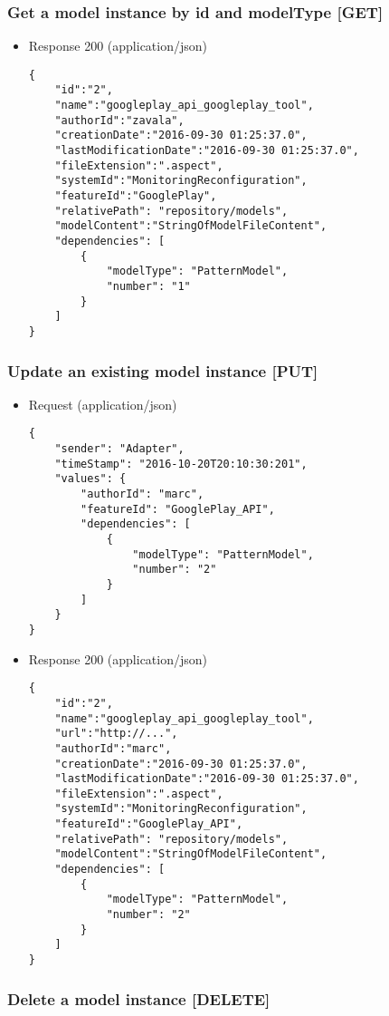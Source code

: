 \subsubsection{Get a model instance by id and modelType
{[}GET{]}}\label{get-a-model-instance-by-id-and-modeltype-get}

\begin{itemize}
\item
  Response 200 (application/json)

\begin{verbatim}
{
    "id":"2",
    "name":"googleplay_api_googleplay_tool",
    "authorId":"zavala",
    "creationDate":"2016-09-30 01:25:37.0",
    "lastModificationDate":"2016-09-30 01:25:37.0",
    "fileExtension":".aspect",
    "systemId":"MonitoringReconfiguration",
    "featureId":"GooglePlay",
    "relativePath": "repository/models",
    "modelContent":"StringOfModelFileContent",
    "dependencies": [
        {
            "modelType": "PatternModel",
            "number": "1"
        }
    ]        
}
\end{verbatim}
\end{itemize}

\subsubsection{Update an existing model instance
{[}PUT{]}}\label{update-an-existing-model-instance-put}

\begin{itemize}
\item
  Request (application/json)

\begin{verbatim}
{
    "sender": "Adapter",
    "timeStamp": "2016-10-20T20:10:30:201",
    "values": {
        "authorId": "marc",
        "featureId": "GooglePlay_API",
        "dependencies": [
            {
                "modelType": "PatternModel",
                "number": "2"
            }
        ]  
    }
}
\end{verbatim}
\item
  Response 200 (application/json)

\begin{verbatim}
{
    "id":"2",
    "name":"googleplay_api_googleplay_tool",
    "url":"http://...",
    "authorId":"marc",
    "creationDate":"2016-09-30 01:25:37.0",
    "lastModificationDate":"2016-09-30 01:25:37.0",
    "fileExtension":".aspect",
    "systemId":"MonitoringReconfiguration",
    "featureId":"GooglePlay_API",
    "relativePath": "repository/models",
    "modelContent":"StringOfModelFileContent",
    "dependencies": [
        {
            "modelType": "PatternModel",
            "number": "2"
        }
    ]
}
\end{verbatim}
\end{itemize}

\subsubsection{Delete a model instance
{[}DELETE{]}}\label{delete-a-model-instance-delete}
